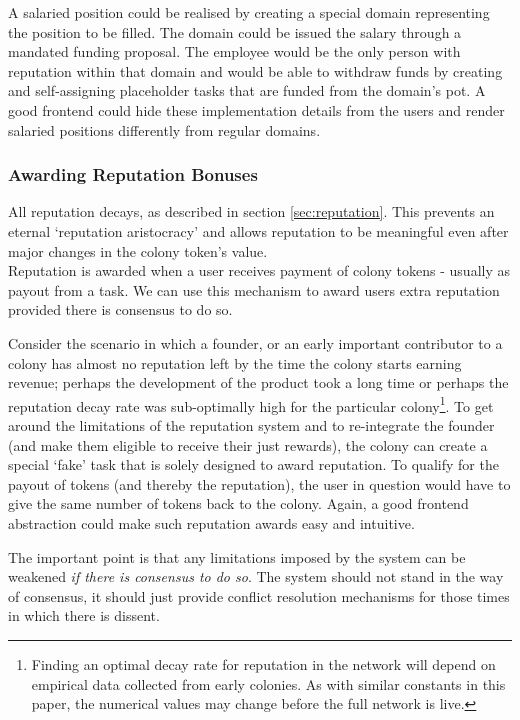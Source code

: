 A salaried position could be realised by creating a special domain representing the position to be filled. The domain could be issued the salary through a mandated funding proposal. The employee would be the only person with reputation within that domain and would be able to withdraw funds by creating and self-assigning placeholder tasks that are funded from the domain's pot. A good frontend could hide these implementation details from the users and render salaried positions differently from regular domains.

\subsubsection{Awarding Reputation Bonuses}

All reputation decays, as described in section \ref{sec:reputation}. This prevents an eternal `reputation aristocracy' and allows reputation to be meaningful even after major changes in the colony token's value. \\
Reputation is awarded when a user receives payment of colony tokens - usually as payout from a task. We can use this mechanism to award users extra reputation provided there is consensus to do so. 

Consider the scenario in which a founder, or an early important contributor to a colony has almost no reputation left by the time the colony starts earning revenue; perhaps the development of the product took a long time or perhaps the reputation decay rate was sub-optimally high for the particular colony\footnote{Finding an optimal decay rate for reputation in the network will depend on empirical data collected from early colonies. As with similar constants in this paper, the numerical values may change before the full network is live.}. To get around the limitations of the reputation system and to re-integrate the founder (and make them eligible to receive their just rewards), the colony can create a special `fake' task that is solely designed to award reputation. To qualify for the payout of tokens (and thereby the reputation), the user in question would have to give the same number of tokens back to the colony. Again, a good frontend abstraction could make such reputation awards easy and intuitive.

The important point is that any limitations imposed by the system can be weakened \emph{if there is consensus to do so}. The system should not stand in the way of consensus, it should just provide conflict resolution mechanisms for those times in which there is dissent.


